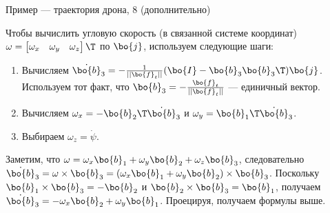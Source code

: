 \begin{frame}{Пример — траектория дрона, 8 (дополнительно)}
	\begin{flushleft}
		
		
		Чтобы вычислить угловую скорость (в связанной системе координат) $\omega = \begin{bmatrix}
			\omega_x & \omega_y & \omega_z
		\end{bmatrix}\T$ по $\bo{j}$, используем следующие шаги:
		
		\begin{enumerate}
			
			\item Вычисляем $\dot{ \bo{b}}_3 =  -\frac{1}{||\bo{f}_t||}(\bo{I} - \bo{b}_3 \bo{b}_3\T) \bo{j}$. \textcolor{mygray}{Используем тот факт, что $\bo{b}_3 = -\frac{\bo{f}_t}{||\bo{f}_t||}$ — единичный вектор.}
			
			\item Вычисляем $\omega_x = - \bo{b}_2\T \dot{ \bo{b}}_3$ и $\omega_y = \bo{b}_1\T \dot{ \bo{b}}_3$.
			
			\item Выбираем $\omega_z = \dot \psi$.
		\end{enumerate}
		
		\bigskip
		
		\textcolor{mygray2}{
			Заметим, что $\omega = \omega_x \bo{b}_1 + \omega_y \bo{b}_2+ \omega_z \bo{b}_3$, следовательно $\dot{ \bo{b}}_3  = \omega \times \bo{b}_3 = ( \omega_x \bo{b}_1 + \omega_y \bo{b}_2) \times \bo{b}_3$. Поскольку $ \bo{b}_1 \times  \bo{b}_3 =  -\bo{b}_2$ и $ \bo{b}_2 \times  \bo{b}_3 =  \bo{b}_1$, получаем $\dot{ \bo{b}}_3  =  -\omega_x \bo{b}_2+ \omega_y \bo{b}_1$. Проецируя, получаем формулы выше.}
		
	\end{flushleft}
\end{frame}